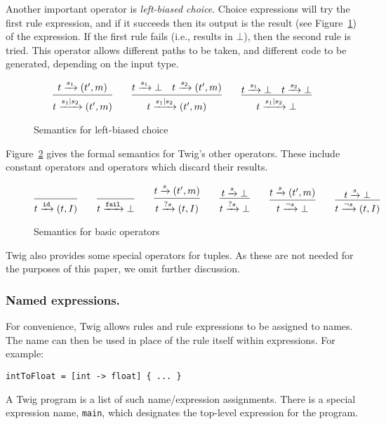 Another important operator is \emph{left-biased choice}. Choice expressions will try the first rule expression, and if it succeeds then its output is the result (see Figure~\ref{semantics:choice}) of the expression. If the first rule fails (i.e., results in $\bot$), then the second rule is tried. This operator allows different paths to be taken, and different code to be generated, depending on the input type.

\begin{figure}[ht]
\[
\infer{t \arr{s_1|s_2} (t',m)}{t \arr{s_1} (t',m)}
\qquad 
\infer{t \arr{s_1|s_2} (t',m)}{t \arr{s_1} \bot \quad t \arr{s_2} (t',m)}
\qquad
\infer{t \arr{s_1|s_2} \bot}{t \arr{s_1} \bot \quad t \arr{s_2} \bot}
\]
\caption{Semantics for left-biased choice}
\label{semantics:choice}
\end{figure}

Figure~\ref{semantics:basic} gives the formal semantics for Twig's other operators. These include constant operators and operators which discard their results.

\begin{figure}[ht]
\[
\infer{t \arr{\mathtt{id}} (t,I)}{}
\qquad
\infer{t \arr{\mathtt{fail}} \bot}{}
\qquad
\infer{t \arr{?s} (t,I)}{t \arr{s} (t',m)}
\qquad 
\infer{t \arr{?s} \bot}{t \arr{s} \bot}
\qquad
\infer{t \arr{\lnot s} \bot}{t \arr{s} (t',m)}
\qquad 
\infer{t \arr{\lnot s} (t,I)}{t \arr{s} \bot}
\]
\caption{Semantics for basic operators}
\label{semantics:basic}
\end{figure}

Twig also provides some special operators for tuples. As these are not needed for the purposes of this paper, we omit further discussion.

\subsubsection{Named expressions.}
\label{section:names}

For convenience, Twig allows rules and rule expressions to be assigned to names. The name can then be used in place of the rule itself within expressions. For example:

\begin{verbatim}
intToFloat = [int -> float] { ... }
\end{verbatim}

A Twig program is a list of such name/expression assignments. There is a special expression name, \texttt{main}, which designates the top-level expression for the program.

